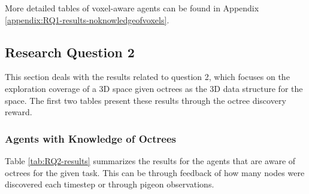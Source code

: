 More detailed tables of voxel-aware agents can be found in Appendix \ref{appendix:RQ1-results-noknowledgeofvoxels}.







\subsection{Research Question 2}\label{chap:4:results-RQ2}

This section deals with the results related to question 2, which focuses on the exploration coverage of a 3D space given octrees as the 3D data structure for the space. 
The first two tables present these results through the octree discovery reward.

\subsubsection{Agents with Knowledge of Octrees}

Table \ref{tab:RQ2-results} summarizes the results for the agents that are aware of octrees for the given task. This can be through feedback of how many nodes were discovered each timestep or through pigeon observations. 

